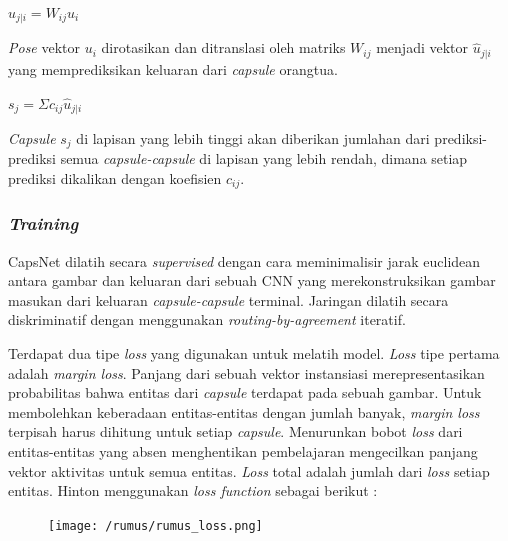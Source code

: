 \documentclass{article}
\begin{document}
	   	\begin{center}
	   		\Large $\hat{u}_{j|i} = W_{ij}u_{i}$
	   	\end{center}
	   	
	   	\par
	   	\textit{Pose} vektor $u_{i}$ dirotasikan dan ditranslasi oleh matriks $W_{ij}$ menjadi vektor $\hat{u}_{j|i}$ yang memprediksikan keluaran dari \textit{capsule} orangtua.
	   	
	   	\begin{center}
	   		\Large $s_{j} = \Sigma c_{ij} \hat{u}_{j|i}$
	   	\end{center}
	   
	   \par
	   \textit{Capsule} $s_{j}$ di lapisan yang lebih tinggi akan diberikan jumlahan dari prediksi-prediksi semua \textit{capsule-capsule} di lapisan yang lebih rendah, dimana setiap prediksi dikalikan dengan koefisien $c_{ij}$.
	   	
	   	\subsubsection{\textit{Training}}
	   	CapsNet dilatih secara \textit{supervised} dengan cara meminimalisir jarak euclidean antara gambar dan keluaran dari sebuah CNN yang merekonstruksikan gambar masukan dari keluaran \textit{capsule-capsule} terminal. Jaringan dilatih secara diskriminatif dengan menggunakan \textit{routing-by-agreement} iteratif. 
	   	\par
	   	Terdapat dua tipe \textit{loss} yang digunakan untuk melatih model. \textit{Loss} tipe pertama adalah \textit{margin loss}. Panjang dari sebuah vektor instansiasi merepresentasikan probabilitas bahwa entitas dari \textit{capsule} terdapat pada sebuah gambar. Untuk membolehkan keberadaan entitas-entitas dengan jumlah banyak, \textit{margin loss} terpisah harus dihitung untuk setiap \textit{capsule}. Menurunkan bobot \textit{loss} dari entitas-entitas yang absen menghentikan pembelajaran mengecilkan panjang vektor aktivitas untuk semua entitas. \textit{Loss} total adalah jumlah dari \textit{loss} setiap entitas. Hinton menggunakan \textit{loss function} sebagai berikut :
	   	
		\begin{figure}[H]
			\centering
			\texttt{[image: /rumus/rumus\_loss.png]}
		\end{figure}
		
\end{document}

